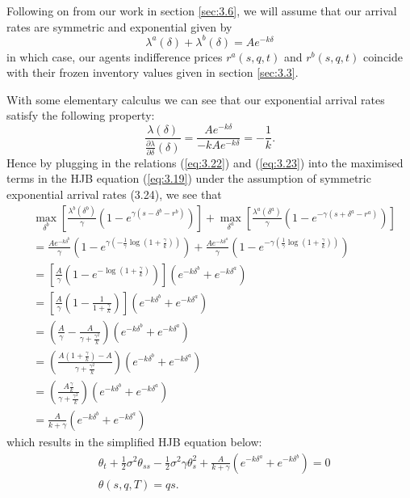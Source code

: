 Following on from our work in section \ref{sec:3.6}, we will assume that our arrival 
rates are symmetric and exponential given by 
\begin{equation}\label{eq:3.24}
    \lambda^a(\delta)+\lambda^b(\delta)=Ae^{-k\delta}
\end{equation}
in which case, our agents indifference prices $r^a(s,q,t)$ and $r^b(s,q,t)$
coincide with their frozen inventory values given in section \ref{sec:3.3}.

With some elementary calculus we can see that our exponential arrival rates satisfy
the following property:
\begin{equation*}
    \frac{\lambda(\delta)}{\frac{\partial\lambda}{\partial\delta}(\delta)}=\frac{Ae^{-k\delta}}{-kAe^{-k\delta}}=-\frac{1}{k}.
\end{equation*}
Hence by plugging in the relations (\ref{eq:3.22}) and (\ref{eq:3.23}) into the 
maximised terms in the HJB equation (\ref{eq:3.19}) under the assumption of symmetric
exponential arrival rates (3.24), we see that
\begin{align*}
    &\max\limits_{\delta^b}\left[\frac{\lambda^b(\delta^b)}{\gamma}(1-e^{\gamma(s-\delta^b-r^b)})\right]+\max\limits_{\delta^a}\left[\frac{\lambda^a(\delta^a)}{\gamma}(1-e^{-\gamma(s+\delta^a-r^a)})\right]\\
    &=\frac{Ae^{-k\delta^b}}{\gamma}\left(1-e^{\gamma\left(-\frac{1}{\gamma}\log\left(1+\frac{\gamma}{k}\right)\right)}\right)+\frac{Ae^{-k\delta^a}}{\gamma}\left(1-e^{-\gamma\left(\frac{1}{\gamma}\log\left(1+\frac{\gamma}{k}\right)\right)}\right)\\
    &=\left[\frac{A}{\gamma}\left(1-e^{-\log\left(1+\frac{\gamma}{k}\right)}\right)\right](e^{-k\delta^b}+e^{-k\delta^a})\\
    &=\left[\frac{A}{\gamma}\left(1-\frac{1}{1+\frac{\gamma}{k}}\right)\right](e^{-k\delta^b}+e^{-k\delta^a})\\
    &=\left(\frac{A}{\gamma}-\frac{A}{\gamma+\frac{\gamma^2}{k}}\right)(e^{-k\delta^b}+e^{-k\delta^a})\\
    &=\left(\frac{A\left(1+\frac{\gamma}{k}\right)-A}{\gamma+\frac{\gamma^2}{k}}\right)(e^{-k\delta^b}+e^{-k\delta^a})\\
    &=\left(\frac{A\frac{\gamma}{k}}{\gamma+\frac{\gamma^2}{k}}\right)(e^{-k\delta^b}+e^{-k\delta^a})\\
    &=\frac{A}{k+\gamma}(e^{-k\delta^b}+e^{-k\delta^a})
\end{align*}
which results in the simplified HJB equation below:
\begin{equation}\label{eq:simp-hjb}
    \begin{aligned} 
        &\theta_t+\frac{1}{2}\sigma^2\theta_{ss}-\frac{1}{2}\sigma^2\gamma\theta^2_s+\frac{A}{k+\gamma}(e^{-k\delta^a}+e^{-k\delta^b})=0\\
        &\theta(s,q,T)=qs.
    \end{aligned}
\end{equation}

